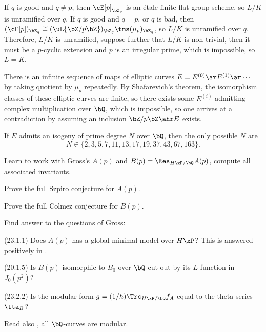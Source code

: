 \documentclass[a4paper, twoside]{article}
\begin{document}
\begin{prf}
	If $q$ is good and $q\neq p$, then $\cE[p]_{\bZ_{q}}$ is an {\'e}tale finite flat group scheme, so $L/K$ is unramified over $q$. If $q$ is good and $q=p$, or $q$ is bad, then $(\cE[p])_{\bZ_{q}}\cong(\uL{\bZ/p\bZ})_{\bZ_{q}}\tms(\mu_{p})_{\bZ_{q}}$, so $L/K$ is unramified over $q$. Therefore, $L/K$ is unramified, suppose further that $L/K$ is non-trivial, then it must be a $p$-cyclic extension and $p$ is an irregular prime, which is impossible, so $L=K$.

	 There is an infinite sequence of maps of elliptic curves $E=E^{(0)}\ar E^{(1)}\ar\cdots$ by taking quotient by $\mu_{p}$ repeatedly. By Shafarevich's theorem, the isomorphism classes of these elliptic curves are finite, so there exists some $E^{(i)}$ admitting complex multiplication over $\bQ$, which is impossible, so one arrives at a contradiction by assuming an inclusion $\bZ/p\bZ\ahr E$ exists.
\end{prf}

\begin{prf}
	If $E$ admits an isogeny of prime degree $N$ over $\bQ$, then the only possible $N$ are
		\[
			N\in\{2,3,5,7,11,13,17,19,37,43,67,163\}.
		\]
\end{prf}






\begin{itm}
	\item[\TODO] Learn to work with Gross's $A(p)$ and $B(p)=\Res_{H\xP/\bQ}A(p)$, compute all associated invariants.
	\item[\HOLD] Prove the full Szpiro conjecture for $A(p)$.
	\item[\HOLD] Prove the full Colmez conjecture for $B(p)$.
	\item[\TODO] Find answer to the questions of Gross:
	\begin{itm}
		\item[\DONE] (23.1.1) Does $A(p)$ has a global minimal model over $H\xP$? This is answered positively in \cite{Gross1982Minimal}.
		\item[\TODO] (20.1.5) Is $B(p)$ isomorphic to $B_{0}$ over $\bQ$ cut out by its $L$-function in $J_{0}(p^{2})$?
		\item[\TODO] (23.2.2) Is the modular form $g=(1/h)\Trc_{H\xP/\bQ}f_{A}$ equal to the theta series $\tta_{B}$?
	\end{itm}
\end{itm}
\begin{rmk}
	Read also \cite[6.2]{Ribet1992}, all $\bQ$-curves are modular.
\end{rmk}
\end{document}
